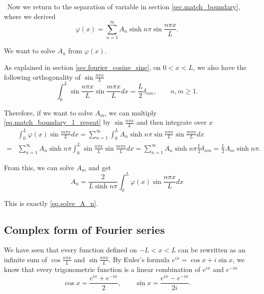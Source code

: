 \quad\, Now we return to the separation of variable in section \ref{sec.match_boundary}, where we derived
\begin{equation}\label{eq.match_boundary_1_repeat}
    \varphi(x) =\sum_{n = 1}^{\infty} A_n \sinh n \pi \sin \frac{n \pi x}{L}.
\end{equation}

We want to solve $A_n$ from $\varphi(x)$.

As explained in section \ref{sec.fourier_cosine_sine}, on $0 < x < L$, we also have the following orthogonality of $\sin \frac{n \pi x}{L}$
\begin{equation}\label{eq.solve_A_n_1}
    \int_{0}^L \sin \frac{n \pi x}{L} \sin \frac{m \pi x}{L} d x= \frac{L}{2} \delta_{n m}, \qquad n,m\ge 1.
\end{equation}

Therefore, if we want to solve $A_m$, we can multiply \eqref{eq.match_boundary_1_repeat} by  $\sin \frac{n \pi x}{L}$ and then integrate over $x$
$$
\begin{aligned}
&\int_{0}^L \varphi(x) \sin \frac{m \pi x}{L} d x  = \sum_{n=1}^{\infty} \int_{0}^L A_n \sinh n \pi \sin \frac{n \pi x}{L} \sin \frac{m \pi x}{L} d x \\
=&\sum_{n=1}^{\infty}  A_n \sinh n \pi \int_{0}^L \sin \frac{n \pi x}{L} \sin \frac{m \pi x}{L} d x=\sum_{n=1}^{\infty}  A_n \sinh n \pi \frac{L}{2} \delta_{n m}= \frac{L}{2} A_m \sinh n \pi .
\end{aligned}
$$

From this, we can solve $A_m$ and get
\begin{equation}\label{eq.solve_A_n_2}
    A_n = \frac{2}{L\sinh n\pi}\int_{0}^{L}\varphi(x)\sin \frac{n \pi x}{L} dx
\end{equation}

This is exactly \eqref{eq.solve_A_n}.

\subsection{Complex form of Fourier series}

We have seen that every function defined on $-L < x < L$ can be rewritten as an infinite sum of $\cos \frac{n \pi x}{L}$ and $\sin \frac{n \pi x}{L}$. By Euler's formula $e^{ix} = \cos x + i\sin x$, we know that every trigonometric function is a linear combination of $e^{ix}$ and $e^{-ix}$
\begin{equation}\label{eq.cos_sin_to_e^ix}
    \cos x = \frac{e^{ix}+e^{-ix}}{2}, \qquad \sin x = \frac{e^{ix}-e^{-ix}}{2i}.
\end{equation}

